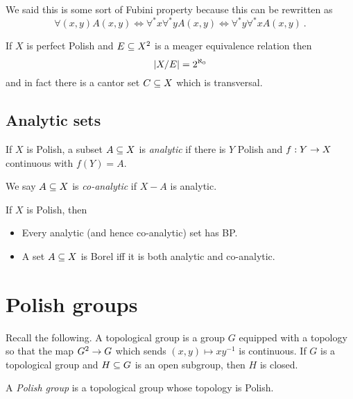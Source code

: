 \documentclass{amsart}
\begin{document}
We said this is some sort of Fubini property because this can be rewritten as
\begin{equation}
\forall\left( x,y \right)A\left( x,y \right)\iff
\forall^* x \forall^* y A\left( x,y \right) \iff
\forall^* y\forall^* x A\left( x,y \right) \ .
\end{equation}

\begin{thm}
If $X$ is perfect Polish and $E\subseteq X^2$ is a meager equivalence relation
then 
\begin{equation}
\left| X/E \right| = 2^{\aleph_0}
\end{equation}
and in fact there is a cantor set $C\subseteq X$ which is transversal.
\label{thm:previous}
\end{thm}

\subsection{Analytic sets}

\begin{defn}
If $X$ is Polish, a subset $A\subseteq X$ is \emph{analytic} if there is $Y$ Polish and
$f:Y\rightarrow X$ continuous with $f\left( Y \right) = A$. 

We say $A\subseteq X$ is \emph{co-analytic} if $X\minus A$ is analytic.
\end{defn}

\begin{thm}
If $X$ is Polish, then
\begin{itemize}
\item Every analytic (and hence co-analytic) set has BP.
\item A set $A\subseteq X$ is Borel iff it is both analytic and co-analytic.
\end{itemize}
\end{thm}

\section{Polish groups}

Recall the following.
A topological group is a group $G$ equipped with a topology so that the map $G^2 \rightarrow
G$ which sends $\left( x,y \right)\mapsto xy^{-1}$ is continuous. 
If $G$ is a topological group and $H\subseteq G$ is an open subgroup, then $H$ is closed.

\begin{defn}
A \emph{Polish group} is a topological group whose topology is Polish.
\end{defn}
\end{document}

